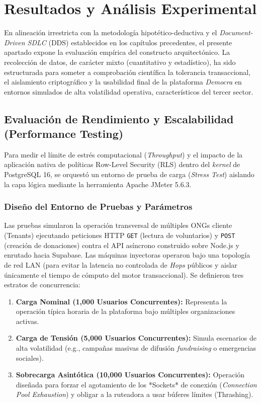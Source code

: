 \documentclass[11pt,a4paper,oneside]{report}
\begin{document}
\chapter{Resultados y An\'alisis Experimental}
\label{chapter:resultados}

En alineaci\'on irrestricta con la metodolog\'ia hipot\'etico-deductiva y el \textit{Document-Driven SDLC} (DDS) establecidos en los cap\'itulos precedentes, el presente apartado expone la evaluaci\'on emp\'irica del constructo arquitect\'onico. La recolecci\'on de datos, de car\'acter mixto (cuantitativo y estad\'istico), ha sido estructurada para someter a comprobaci\'on cient\'ifica la tolerancia transaccional, el aislamiento criptogr\'afico y la usabilidad final de la plataforma \textit{Democra} en entornos simulados de alta volatilidad operativa, caracter\'isticos del tercer sector.

\section{Evaluaci\'on de Rendimiento y Escalabilidad (Performance Testing)}

Para medir el l\'imite de estr\'es computacional (\textit{Throughput}) y el impacto de la aplicaci\'on nativa de pol\'iticas Row-Level Security (RLS) dentro del \textit{kernel} de PostgreSQL 16, se orquest\'o un entorno de prueba de carga (\textit{Stress Test}) aislando la capa l\'ogica mediante la herramienta Apache JMeter 5.6.3.

\subsection{Dise\~no del Entorno de Pruebas y Par\'ametros}
Las pruebas simularon la operaci\'on transversal de m\'ultiples ONGs cliente (Tenants) ejecutando peticiones HTTP \texttt{GET} (lectura de voluntarios) y \texttt{POST} (creaci\'on de donaciones) contra el API as\'incrono construido sobre Node.js y enrutado hacia Supabase. Las m\'aquinas inyectoras operaron bajo una topolog\'ia de red LAN (para evitar la latencia no controlada de \textit{Hops} p\'ublicos y aislar \'unicamente el tiempo de c\'omputo del motor transaccional).
Se definieron tres estratos de concurrencia:
\begin{enumerate}
    \item \textbf{Carga Nominal (1,000 Usuarios Concurrentes):} Representa la operaci\'on t\'ipica horaria de la plataforma bajo m\'ultiples organizaciones activas.
    \item \textbf{Carga de Tensi\'on (5,000 Usuarios Concurrentes):} Simula escenarios de alta volatilidad (e.g., campa\~nas masivas de difusi\'on \textit{fundraising} o emergencias sociales).
    \item \textbf{Sobrecarga Asint\'otica (10,000 Usuarios Concurrentes):} Operaci\'on dise\~nada para forzar el agotamiento de los *Sockets* de conexi\'on (\textit{Connection Pool Exhaustion}) y obligar a la ruteadora a usar b\'uferes l\'imites (Thrashing).
\end{enumerate}
\end{document}
